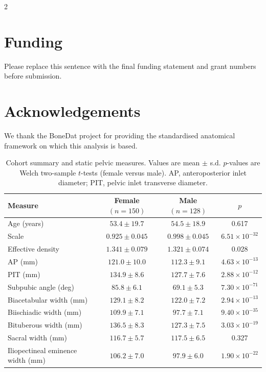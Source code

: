\documentclass[openacc]{rsproca_new}
\begin{document}
\begin{multicols}{2}
\section*{Funding}

Please replace this sentence with the final funding statement and grant numbers before submission.

\section*{Acknowledgements}

We thank the BoneDat project for providing the standardised anatomical framework on which this analysis is based.

\end{multicols}

\begin{table}[p]
\centering
\caption{Cohort summary and static pelvic measures. Values are mean $\pm$ s.d. $p$-values are Welch two-sample $t$-tests (female versus male). AP, anteroposterior inlet diameter; PIT, pelvic inlet transverse diameter.}
\label{tab:cohort}
\begin{tabular}{lccc}
\toprule
Measure & Female $(n=150)$ & Male $(n=128)$ & $p$ \\
\midrule
Age (years) & $53.4 \pm 19.7$ & $54.5 \pm 18.9$ & 0.617 \\
Scale & $0.925 \pm 0.045$ & $0.998 \pm 0.045$ & $6.51 \times 10^{-32}$ \\
Effective density & $1.341 \pm 0.079$ & $1.321 \pm 0.074$ & 0.028 \\
AP (mm) & $121.0 \pm 10.0$ & $112.3 \pm 9.1$ & $4.63 \times 10^{-13}$ \\
PIT (mm) & $134.9 \pm 8.6$ & $127.7 \pm 7.6$ & $2.88 \times 10^{-12}$ \\
Subpubic angle (deg) & $85.8 \pm 6.1$ & $69.1 \pm 5.3$ & $7.30 \times 10^{-71}$ \\
Biacetabular width (mm) & $129.1 \pm 8.2$ & $122.0 \pm 7.2$ & $2.94 \times 10^{-13}$ \\
Biischiadic width (mm) & $109.9 \pm 7.1$ & $97.7 \pm 7.1$ & $9.40 \times 10^{-35}$ \\
Bituberous width (mm) & $136.5 \pm 8.3$ & $127.3 \pm 7.5$ & $3.03 \times 10^{-19}$ \\
Sacral width (mm) & $116.7 \pm 5.7$ & $117.5 \pm 6.5$ & 0.327 \\
Iliopectineal eminence width (mm) & $106.2 \pm 7.0$ & $97.9 \pm 6.0$ & $1.90 \times 10^{-22}$ \\
\bottomrule
\end{tabular}
\end{table}
\end{document}
